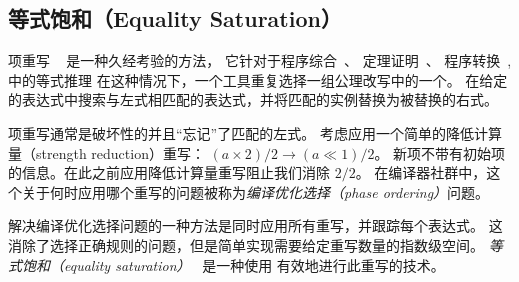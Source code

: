 \subsection{等式饱和（Equality Saturation）}
\label{sec:eqsat}

项重写 ~\cite{nachum-rewrites} 是一种久经考验的方法，
  它针对于程序综合~\cite{eqsat, denali}、
  定理证明~\cite{simplify, z3}、
  程序转换~\cite{graphs},
  中的等式推理
在这种情况下，一个工具重复选择一组公理改写中的一个。
  在给定的表达式中搜索与左式相匹配的表达式，并将匹配的实例替换为被替换的右式。

项重写通常是破坏性的并且“忘记”了匹配的左式。
考虑应用一个简单的降低计算量（strength reduction）重写：
  ${ (a \times 2) / 2 \to (a \ll 1) / 2 }$。
新项不带有初始项的信息。在此之前应用降低计算量重写阻止我们消除 $2/2$。
在编译器社群中，这个关于何时应用哪个重写的问题被称为\textit{编译优化选择（phase ordering）}问题。


解决编译优化选择问题的一种方法是同时应用所有重写，并跟踪每个表达式。
这消除了选择正确规则的问题，但是简单实现需要给定重写数量的指数级空间。
\textit{等式饱和（equality saturation）}~\cite{eqsat, eqsat-llvm} 是一种使用 \egraph 有效地进行此重写的技术。


